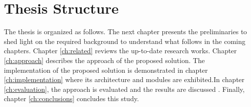 \section {Thesis Structure}
The thesis is organized as follows. The next chapter presents the preliminaries to shed light on the required background to understand what follows in the coming chapters. Chapter \ref{ch:related} reviews the up-to-date research works. Chapter \ref{ch:approach} describes the approach of the proposed solution. The implementation of the proposed solution is demonstrated in chapter \ref{ch:implementation} where its architecture and modules are exhibited.In chapter \ref{ch:evaluation}, the approach is evaluated  and the results are discussed . Finally, chapter
\ref{ch:conclusions} concludes this study.





